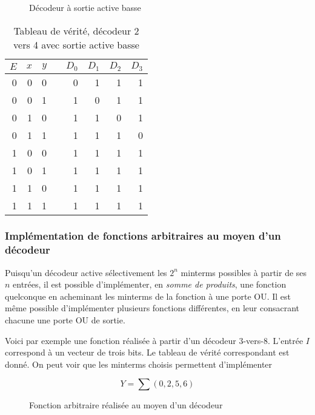 \documentclass[11pt]{article}
\begin{document}
\begin{figure}[htbp]
\centering

\caption{\label{fig:orgc72a4a0}Décodeur à sortie active basse}
\end{figure}


\begin{table}[htbp]
\caption{\label{tab:org0fb59b1}Tableau de vérité, décodeur 2 vers 4 avec sortie active basse}
\centering
\begin{tabular}{rrrlrrrr}
\(E\) & \(x\) & \(y\) &  & \(D_0\) & \(D_1\) & \(D_2\) & \(D_3\)\\
\hline
0 & 0 & 0 &  & 0 & 1 & 1 & 1\\
0 & 0 & 1 &  & 1 & 0 & 1 & 1\\
0 & 1 & 0 &  & 1 & 1 & 0 & 1\\
0 & 1 & 1 &  & 1 & 1 & 1 & 0\\
1 & 0 & 0 &  & 1 & 1 & 1 & 1\\
1 & 0 & 1 &  & 1 & 1 & 1 & 1\\
1 & 1 & 0 &  & 1 & 1 & 1 & 1\\
1 & 1 & 1 &  & 1 & 1 & 1 & 1\\
\end{tabular}
\end{table}


\subsubsection{Implémentation de fonctions arbitraires au moyen d'un décodeur}
\label{sec:orgc3af5fa}

Puisqu'un décodeur active sélectivement les \(2^n\) minterms possibles
à partir de ses \(n\) entrées, il est possible d'implémenter, en \emph{somme
de produits}, une fonction quelconque en acheminant les minterms de la
fonction à une porte OU. Il est même possible d'implémenter plusieurs
fonctions différentes, en leur consacrant chacune une porte OU de
sortie.

Voici par exemple une fonction réalisée à partir d'un décodeur
3-vers-8. L'entrée \(I\) correspond à un vecteur de trois bits. Le
tableau de vérité correspondant est donné. On peut voir que les
minterms choisis permettent d'implémenter

$$ Y = \sum(0,2,5,6)$$

\begin{figure}[htbp]
\centering

\caption{\label{fig:orgd3936ae}Fonction arbitraire réalisée au moyen d'un décodeur}
\end{figure}
\end{document}
